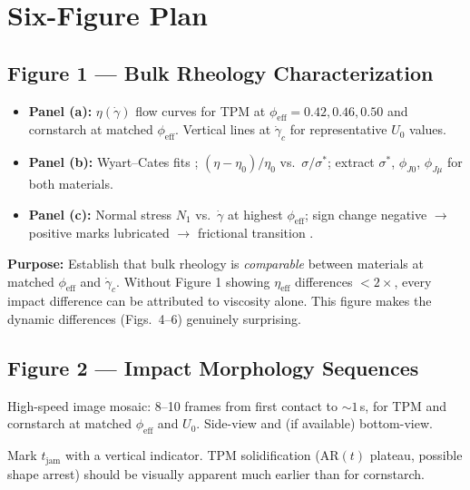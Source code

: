 \documentclass[11pt,letterpaper]{article}
\newcommand{\phieff}{\phi_{\mathrm{eff}}}
\newcommand{\phiJz}{\phi_{J0}}
\newcommand{\phiJmu}{\phi_{J\mu}}
\newcommand{\tjam}{t_{\mathrm{jam}}}
\newcommand{\etaeff}{\eta_{\mathrm{eff}}}
\newcommand{\gamcrit}{\dot{\gamma}_c}
\newcommand{\sigstar}{\sigma^*}
\begin{document}
\section{Six-Figure Plan}

\subsection{Figure 1 --- Bulk Rheology Characterization}

\begin{itemize}[noitemsep,topsep=3pt]
  \item \textbf{Panel (a):} $\eta(\dot\gamma)$ flow curves for TPM at
    $\phieff = 0.42, 0.46, 0.50$ and cornstarch at matched $\phieff$.
    Vertical lines at $\gamcrit$ for representative $U_0$ values.
  \item \textbf{Panel (b):} Wyart--Cates fits \cite{WyartCates2014};
    $(\eta-\eta_0)/\eta_0$ vs.\ $\sigma/\sigstar$; extract $\sigstar$,
    $\phiJz$, $\phiJmu$ for both materials.
  \item \textbf{Panel (c):} Normal stress $N_1$ vs.\ $\dot\gamma$ at highest
    $\phieff$; sign change negative $\to$ positive marks lubricated $\to$
    frictional transition \cite{Seto2013}.
\end{itemize}

\begin{intuitionbox}
\textbf{Purpose:} Establish that bulk rheology is \emph{comparable} between
materials at matched $\phieff$ and $\gamcrit$. Without Figure 1 showing
$\etaeff$ differences $<2\times$, every impact difference can be attributed
to viscosity alone. This figure makes the dynamic differences (Figs.\ 4--6)
genuinely surprising.
\end{intuitionbox}

\subsection{Figure 2 --- Impact Morphology Sequences}

High-speed image mosaic: 8--10 frames from first contact to ${\sim}1$\,s,
for TPM and cornstarch at matched $\phieff$ and $U_0$. Side-view and
(if available) bottom-view.

Mark $\tjam$ with a vertical indicator. TPM solidification ($\text{AR}(t)$
plateau, possible shape arrest) should be visually apparent much earlier
than for cornstarch.
\end{document}
